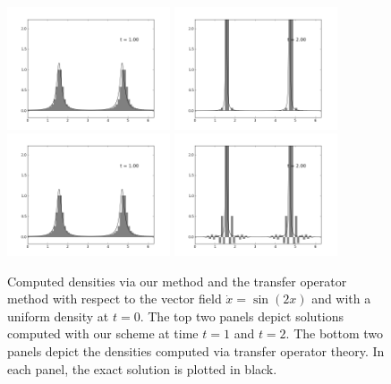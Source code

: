 \documentclass[letterpaper, 12 pt]{amsart}
\begin{document}
\begin{figure}[p]
  \centering
  \includegraphics[width=0.43\textwidth]{./images/half_density_sqr_t1_00.png}
  \includegraphics[width=0.43\textwidth]{./images/half_density_sqr_t2_00.png}
  \includegraphics[width=0.43\textwidth]{./images/transfer_op_t1_00.png}
  \includegraphics[width=0.43\textwidth]{./images/transfer_op_t2_00.png}
  \caption{Computed densities via our method and the transfer operator method with respect to the vector field $\dot{x} = \sin(2x)$ and with a uniform density at $t=0$.  The top two panels depict solutions computed with our scheme at time $t=1$ and $t=2$.   The bottom two panels depict the densities computed via transfer operator theory.  In each panel, the exact solution is plotted in black.}
  \label{fig:one_dim_system}
\end{figure}
\end{document}

